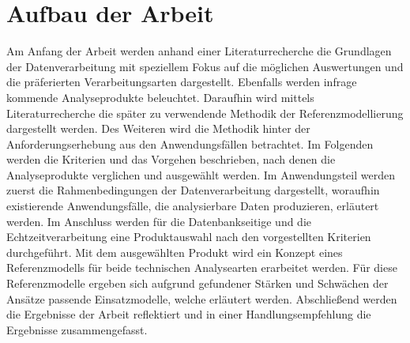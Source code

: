 \section{Aufbau der Arbeit}

Am Anfang der Arbeit werden anhand einer Literaturrecherche die Grundlagen der Datenverarbeitung mit speziellem Fokus auf die möglichen Auswertungen und die präferierten Verarbeitungsarten dargestellt. 
Ebenfalls werden infrage kommende Analyseprodukte beleuchtet. 
Daraufhin wird mittels Literaturrecherche die später zu verwendende Methodik der Referenzmodellierung dargestellt werden. 
Des Weiteren wird die Methodik hinter der Anforderungserhebung aus den Anwendungsfällen betrachtet. 
Im Folgenden werden die Kriterien und das Vorgehen beschrieben, nach denen die Analyseprodukte verglichen und ausgewählt werden. 
Im Anwendungsteil werden zuerst die Rahmenbedingungen der Datenverarbeitung dargestellt, woraufhin existierende Anwendungsfälle, die analysierbare Daten produzieren, erläutert werden. 
Im Anschluss werden für die Datenbankseitige und die Echtzeitverarbeitung eine Produktauswahl nach den
vorgestellten Kriterien durchgeführt. Mit dem ausgewählten Produkt wird ein Konzept eines Referenzmodells für beide
technischen Analysearten erarbeitet werden. Für diese Referenzmodelle ergeben sich aufgrund gefundener Stärken und
Schwächen der Ansätze passende Einsatzmodelle, welche erläutert werden. Abschließend werden die Ergebnisse der Arbeit reflektiert und in einer Handlungsempfehlung die Ergebnisse zusammengefasst.